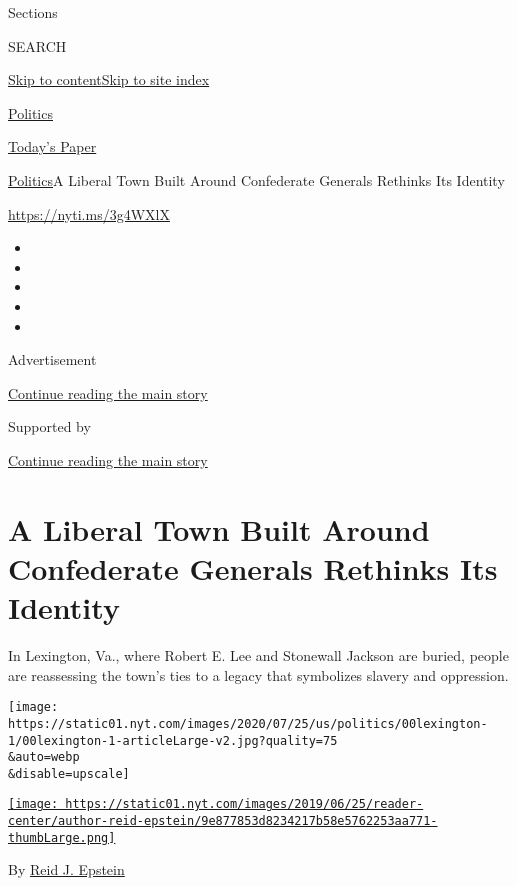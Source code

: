 Sections

SEARCH

\protect\hyperlink{site-content}{Skip to
content}\protect\hyperlink{site-index}{Skip to site index}

\href{https://www.nytimes.com/section/politics}{Politics}

\href{https://myaccount.nytimes.com/auth/login?response_type=cookie\&client_id=vi}{}

\href{https://www.nytimes.com/section/todayspaper}{Today's Paper}

\href{/section/politics}{Politics}\textbar{}A Liberal Town Built Around
Confederate Generals Rethinks Its Identity

\url{https://nyti.ms/3g4WXlX}

\begin{itemize}
\item
\item
\item
\item
\item
\end{itemize}

Advertisement

\protect\hyperlink{after-top}{Continue reading the main story}

Supported by

\protect\hyperlink{after-sponsor}{Continue reading the main story}

\hypertarget{a-liberal-town-built-around-confederate-generals-rethinks-its-identity}{%
\section{A Liberal Town Built Around Confederate Generals Rethinks Its
Identity}\label{a-liberal-town-built-around-confederate-generals-rethinks-its-identity}}

In Lexington, Va., where Robert E. Lee and Stonewall Jackson are buried,
people are reassessing the town's ties to a legacy that symbolizes
slavery and oppression.

\texttt{[image: https://static01.nyt.com/images/2020/07/25/us/politics/00lexington-1/00lexington-1-articleLarge-v2.jpg?quality=75\\\&auto=webp\\\&disable=upscale]}

\href{https://www.nytimes.com/by/reid-j-epstein}{\texttt{[image: https://static01.nyt.com/images/2019/06/25/reader-center/author-reid-epstein/9e877853d8234217b58e5762253aa771-thumbLarge.png]}}

By \href{https://www.nytimes.com/by/reid-j-epstein}{Reid J. Epstein}

